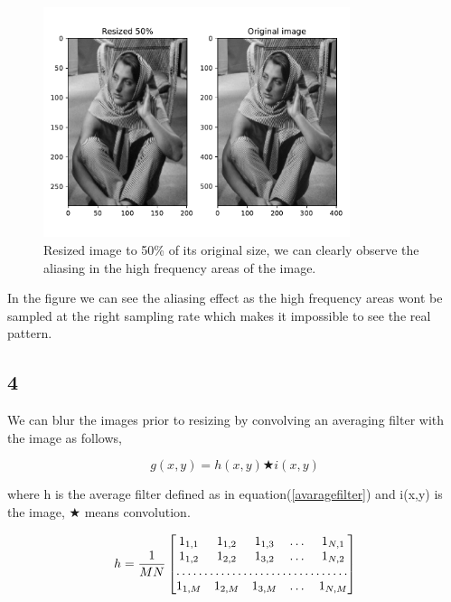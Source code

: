 {\begin{figure}[!htb]
    {\centering
        \includegraphics[width=0.80\textwidth]{resized.pdf}
        \caption{Resized image to 50\% of its original size, we can clearly observe the aliasing in the high frequency areas of the image.}
        \label{resized}
    \par}
    \end{figure}

In the figure we can see the aliasing effect as the high frequency areas wont be sampled at the right sampling rate which makes it impossible to see the real pattern.

\subsection{4}

We can blur the images prior to resizing by convolving an averaging filter with the image as follows,
\begin{figure}[!htb]
\begin{equation}
    g(x,y) = h(x,y) \bigstar i(x,y)
\end{equation}
\end{figure}

where h is the average filter defined as in equation(\ref{avaragefilter}) and i(x,y) is the image, $\bigstar$ means convolution. 

\begin{figure}[!htb]
\begin{equation}
    h = \frac{1}{MN}\begin{bmatrix}
        1_{1,1}       & 1_{1,2} & 1_{1,3} & \dots & 1_{N,1} \\
        1_{1,2}       & 1_{2,2} & 1_{3,2} & \dots & 1_{N,2} \\
        \hdotsfor{5} \\
        1_{1,M}       & 1_{2,M} & 1_{3,M} & \dots & 1_{N,M}
    \end{bmatrix}
    \label{avaragefilter}
\end{equation}
\end{figure}

}

